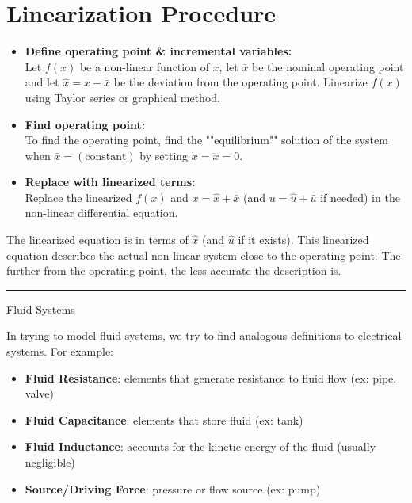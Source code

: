 \documentclass[12pt]{article}
\begin{document}
\section*{Linearization Procedure}
\begin{itemize}
    \item[I.] \textbf{Define operating point \& incremental variables:} \\
    Let $f(x)$ be a non-linear function of $x$, let $\bar{x}$ be the nominal operating point and let $\hat{x} = x - \bar{x}$ be the deviation from the operating point. Linearize $f(x)$ using Taylor series or graphical method.
    
    \item[II.] \textbf{Find operating point:} \\
    To find the operating point, find the ""equilibrium"" solution of the system when $\bar{x} = (\text{constant})$ by setting $\dot{x} = \ddot{x}=0$.
    
    \item[III.] \textbf{Replace with linearized terms:} \\
    Replace the linearized $f(x)$ and $x = \hat{x} + \bar{x}$ (and $u = \hat{u} + \bar{u}$ if needed) in the non-linear differential equation.
\end{itemize}
The linearized equation is in terms of $\hat{x}$ (and $\hat{u}$ if it exists). This linearized equation describes the actual non-linear system close to the operating point. The further from the operating point, the less accurate the description is.
\noindent\hrule
\vspace{1em}
\newpage
\begin{center}
{\LARGE Fluid Systems\par}
\end{center}
In trying to model fluid systems, we try to find analogous definitions to electrical systems. For example:
\begin{itemize}
    \item \textbf{Fluid Resistance}: elements that generate resistance to fluid flow (ex: pipe, valve)
    \item \textbf{Fluid Capacitance}: elements that store fluid (ex: tank)
    \item \textbf{Fluid Inductance}: accounts for the kinetic energy of the fluid (usually negligible)
    \item \textbf{Source/Driving Force}: pressure or flow source (ex: pump)
\end{itemize}
\end{document}
